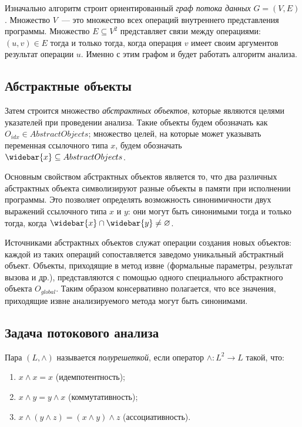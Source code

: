 \documentclass[14pt,titlepage,draft]{extarticle}
\newcommand{\pts}[1]{\widebar{#1}}
\newcommand{\AO}[1]{O_{#1}}
\newcommand{\AOGlobal}{\AO{global}}
\newcommand{\meet}{\wedge}
\begin{document}
    Изначально алгоритм строит ориентированный \emph{граф потока данных}
    $G = (V, E)$. Множество $V$~--- это множество всех операций внутреннего
    представления программы.
    Множество $E \subseteq V^2$ представляет связи между операциями:
    $(u, v) \in E$ тогда и только тогда, когда операция $v$ имеет своим
    аргументов результат операции $u$. Именно с этим графом и будет работать
    алгоритм анализа.

  \subsection{Абстрактные объекты}

    Затем строится множество \emph{абстрактных объектов}, которые являются
    целями указателей при проведении анализа.
    Такие объекты будем обозначать как $\AO{idx} \in AbstractObjects$;
    множество целей, на которые может указывать переменная ссылочного типа $x$,
    будем обозначать $\pts{x} \subseteq AbstractObjects$.

    Основным свойством абстрактных объектов является то, что два различных
    абстрактных объекта символизируют разные объекты в памяти при исполнении
    программы. Это позволяет определять возможность синонимичности двух
    выражений ссылочного типа $x$ и $y$: они могут быть синонимыми тогда и
    только тогда, когда $\pts{x} \cap \pts{y} \ne \emptyset$.

    Источниками абстрактных объектов служат операции создания новых объектов:
    каждой из таких операций сопоставляется заведомо уникальный абстрактный
    объект.
    Объекты, приходящие в метод извне (формальные параметры, результат вызова и
    др.), представляются с помощью одного специального абстрактного объекта
    $\AOGlobal$. Таким образом консервативно полагается, что все значения,
    приходящие извне анализируемого метода могут быть синонимами.

  \subsection{Задача потокового анализа}

    Пара $(L, \meet)$ называется \emph{полурешеткой}, если
    оператор $\meet\colon L^2 \to L$ такой, что:
    \begin{enumerate}
      \item $x \meet x = x$ (идемпотентность);
      \item $x \meet y = y \meet x$ (коммутативность);
      \item $x \meet (y \meet z) = (x \meet y) \meet z$ (ассоциативность).
    \end{enumerate}
\end{document}
